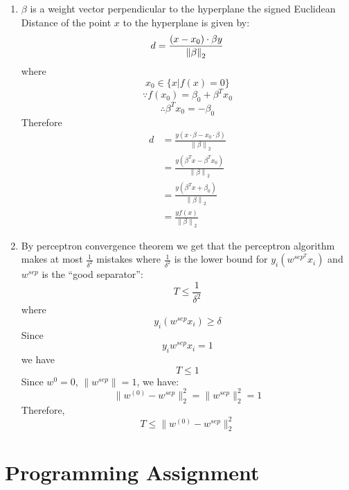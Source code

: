 \documentclass[11pt, oneside]{article}   	%
\begin{document}
\begin{enumerate}
\item %
  $\beta$ is a weight vector perpendicular to the hyperplane
  the signed Euclidean Distance of the point $x$ to the hyperplane is given by:
  \[
  d=\frac{(x-x_0) \cdot \beta y} {\left \| \beta \right \|_2}\\
  \]
  where
  \[
  x_0 \in \{x|f(x)=0\}
  \]
  \[
  \because f(x_0)=\beta_0 + \beta^Tx_0
  \]
  \[
  \therefore \beta^T x_0 = -\beta_0
  \]
  Therefore
  \begin{equation}
    \begin{split}
      d&=\frac{y(x \cdot \beta - x_0 \cdot \beta)} {\left \| \beta \right \|_2}\\
      &=\frac{y(\beta^T x - \beta^T x_0)} {\left \| \beta \right \|_2}\\
      &=\frac{y(\beta^T x + \beta_0)} {\left \| \beta \right \|_2}\\
      &=\frac{yf(x)} {\left \| \beta \right \|_2}
    \end{split}
  \end{equation}

\item
  By perceptron convergence theorem we get that the perceptron algorithm makes at most $\frac{1}{\delta^2}$ mistakes where $\frac{1}{\delta^2}$ is the lower bound for $y_i(w^{sep^T}x_i)$ and $w^{sep}$ is the ``good separator'':
  \[
  T \leq \frac{1}{\delta^2}
  \]
  where
  \[
  y_i(w^{sep} x_i) \geq \delta
  \]
  Since
  \[
  y_i w^{sep} x_i =1
  \]
  we have
  \[
  T \leq 1
  \]
  Since $w^{0}=0$, $\|w^{sep}\|=1$, we have:
  \[
  \| w^{(0)} - w^{sep} \|^2_2 = \| w^{sep} \|^2_2 = 1
  \]
  Therefore,
  \[
  T \leq \| w^{(0)} - w^{sep} \|^2_2
  \]  
\end{enumerate}


\section{Programming Assignment}
\end{document}
